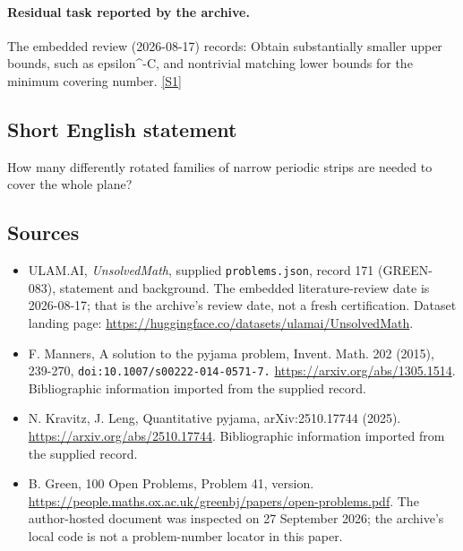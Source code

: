 \documentclass[11pt,a4paper]{article}
\newcommand{\sref}[2]{\hyperlink{source:#1:#2}{[S#2]}}
\begin{document}
\paragraph{Residual task reported by the archive.}

The embedded review (2026-08-17) records: Obtain substantially smaller upper bounds, such as epsilon\textasciicircum{}{-C}, and nontrivial matching lower bounds for the minimum covering number. \sref{171}{1}

\subsection{Short English statement}

How many differently rotated families of narrow periodic strips are needed to cover the whole plane?

\subsection{Sources}

{\small

\begin{itemize}

\item[\hypertarget{source:171:1}{S1}] ULAM.AI, \emph{UnsolvedMath}, supplied \texttt{problems.json}, record 171 (GREEN-083), statement and background. The embedded literature-review date is 2026-08-17; that is the archive’s review date, not a fresh certification. Dataset landing page: \url{https://huggingface.co/datasets/ulamai/UnsolvedMath}.

\item[\hypertarget{source:171:2}{S2}] F. Manners, A solution to the pyjama problem, Invent. Math. 202 (2015), 239-270, \nolinkurl{doi:10.1007/s00222-014-0571-7.} \url{https://arxiv.org/abs/1305.1514}. Bibliographic information imported from the supplied record.

\item[\hypertarget{source:171:3}{S3}] N. Kravitz, J. Leng, Quantitative pyjama, arXiv:2510.17744 (2025). \url{https://arxiv.org/abs/2510.17744}. Bibliographic information imported from the supplied record.

\item[\hypertarget{source:171:4}{S4}] B. Green, 100 Open Problems, Problem 41, version. \url{https://people.maths.ox.ac.uk/greenbj/papers/open-problems.pdf}. The author-hosted document was inspected on 27 September 2026; the archive’s local code is not a problem-number locator in this paper.

\end{itemize}

}

\label{end:171}
\end{document}
